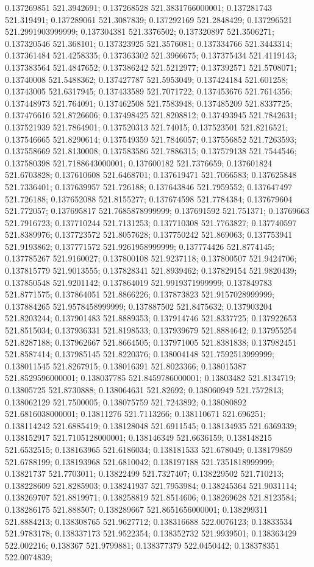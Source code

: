 0.137269851 521.3942691; 0.137268528 521.3831766000001; 0.137281743 521.319491; 0.137289061 521.3087839; 0.137292169 521.2848429; 0.137296521 521.2991903999999; 0.137304381 521.3376502; 0.137320897 521.3506271; 0.137320546 521.368101; 0.137323925 521.3576081; 0.137334766 521.3443314; 0.137361484 521.4258335; 0.137363302 521.3966675; 0.137375434 521.4119143; 0.137383564 521.4847652; 0.137386242 521.5212977; 0.137392571 521.5708071; 0.13740008 521.5488362; 0.137427787 521.5953049; 0.137424184 521.601258; 0.13743005 521.6317945; 0.137433589 521.7071722; 0.137453676 521.7614356; 0.137448973 521.764091; 0.137462508 521.7583948; 0.137485209 521.8337725; 0.137476616 521.8726606; 0.137498425 521.8208812; 0.137493945 521.7842631; 0.137521939 521.7864901; 0.137520313 521.74015; 0.137523501 521.8216521; 0.137546665 521.8290614; 0.137549359 521.7846057; 0.137556852 521.7263593; 0.137558669 521.8130008; 0.137583586 521.7886315; 0.137579138 521.7544546; 0.137580398 521.7188643000001; 0.137600182 521.7376659; 0.137601824 521.6703828; 0.137610608 521.6468701; 0.137619471 521.7066583; 0.137625848 521.7336401; 0.137639957 521.726188; 0.137643846 521.7959552; 0.137647497 521.726188; 0.137652088 521.8155277; 0.137674598 521.7784384; 0.137679604 521.772057; 0.137695817 521.7685878999999; 0.137691592 521.751371; 0.13769663 521.7916723; 0.137710244 521.7131253; 0.137710308 521.7763827; 0.137740597 521.8389976; 0.137723572 521.8057628; 0.137750242 521.869063; 0.137753941 521.9193862; 0.137771572 521.9261958999999; 0.137774426 521.8774145; 0.137785267 521.9160027; 0.137800108 521.9237118; 0.137800507 521.9424706; 0.137815779 521.9013555; 0.137828341 521.8939462; 0.137829154 521.9820439; 0.137850548 521.9201142; 0.137864019 521.9919371999999; 0.137849783 521.8771575; 0.137864051 521.8866226; 0.137873823 521.9157028999999; 0.137884265 521.9578458999999; 0.137887502 521.8475632; 0.137903204 521.8203244; 0.137901483 521.8889353; 0.137914746 521.8337725; 0.137922653 521.8515034; 0.137936331 521.8198533; 0.137939679 521.8884642; 0.137955254 521.8287188; 0.137962667 521.8664505; 0.137971005 521.8381838; 0.137982451 521.8587414; 0.137985145 521.8220376; 0.138004148 521.7592513999999; 0.138011545 521.8267915; 0.138016391 521.8023366; 0.138015387 521.8529596000001; 0.138037785 521.8459786000001; 0.13803482 521.8134719; 0.13805725 521.8730888; 0.138064631 521.82692; 0.138060949 521.7572813; 0.138062129 521.7500005; 0.138075759 521.7243892; 0.138080892 521.6816038000001; 0.13811276 521.7113266; 0.138110671 521.696251; 0.138114242 521.6885419; 0.138128048 521.6911545; 0.138134935 521.6369339; 0.138152917 521.7105128000001; 0.138146349 521.6636159; 0.138148215 521.6532515; 0.138163965 521.6186034; 0.138181533 521.678049; 0.138179859 521.6788199; 0.138193968 521.6810042; 0.138197188 521.7351818999999; 0.13821737 521.7703011; 0.13822499 521.7327407; 0.138229502 521.710213; 0.138228609 521.8285903; 0.138241937 521.7953984; 0.138245364 521.9031114; 0.138269707 521.8819971; 0.138258819 521.8514606; 0.138269628 521.8123584; 0.138286175 521.888507; 0.138289667 521.8651656000001; 0.138299311 521.8884213; 0.138308765 521.9627712; 0.138316688 522.0076123; 0.13833534 521.9783178; 0.138337173 521.9522354; 0.138352732 521.9939501; 0.138363429 522.002216; 0.138367 521.9799881; 0.138377379 522.0450442; 0.138378351 522.0074839; 